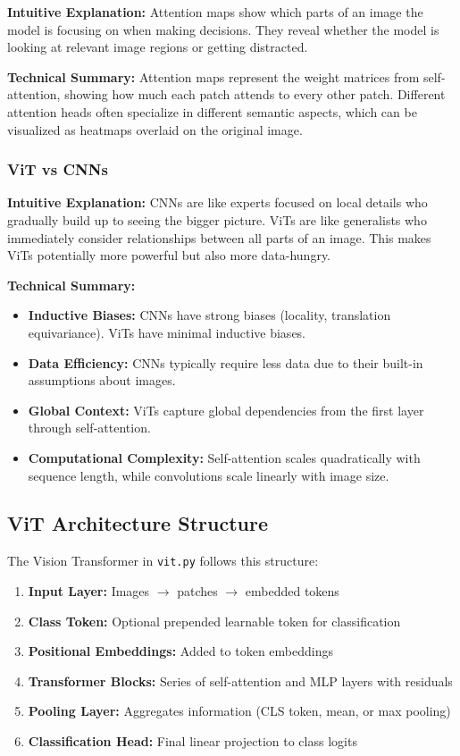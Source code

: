 \textbf{Intuitive Explanation:} Attention maps show which parts of an image the model is focusing on when making decisions. They reveal whether the model is looking at relevant image regions or getting distracted.

\textbf{Technical Summary:} Attention maps represent the weight matrices from self-attention, showing how much each patch attends to every other patch. Different attention heads often specialize in different semantic aspects, which can be visualized as heatmaps overlaid on the original image.

\subsubsection*{ViT vs CNNs}

\textbf{Intuitive Explanation:} CNNs are like experts focused on local details who gradually build up to seeing the bigger picture. ViTs are like generalists who immediately consider relationships between all parts of an image. This makes ViTs potentially more powerful but also more data-hungry.

\textbf{Technical Summary:}
\begin{itemize}
    \item \textbf{Inductive Biases:} CNNs have strong biases (locality, translation equivariance). ViTs have minimal inductive biases.
    \item \textbf{Data Efficiency:} CNNs typically require less data due to their built-in assumptions about images.
    \item \textbf{Global Context:} ViTs capture global dependencies from the first layer through self-attention.
    \item \textbf{Computational Complexity:} Self-attention scales quadratically with sequence length, while convolutions scale linearly with image size.
\end{itemize}
\subsection*{ViT Architecture Structure}

The Vision Transformer in \texttt{vit.py} follows this structure:

\begin{enumerate}
    \item \textbf{Input Layer:} Images $\rightarrow$ patches $\rightarrow$ embedded tokens
    \item \textbf{Class Token:} Optional prepended learnable token for classification
    \item \textbf{Positional Embeddings:} Added to token embeddings
    \item \textbf{Transformer Blocks:} Series of self-attention and MLP layers with residuals
    \item \textbf{Pooling Layer:} Aggregates information (CLS token, mean, or max pooling)
    \item \textbf{Classification Head:} Final linear projection to class logits
\end{enumerate}

